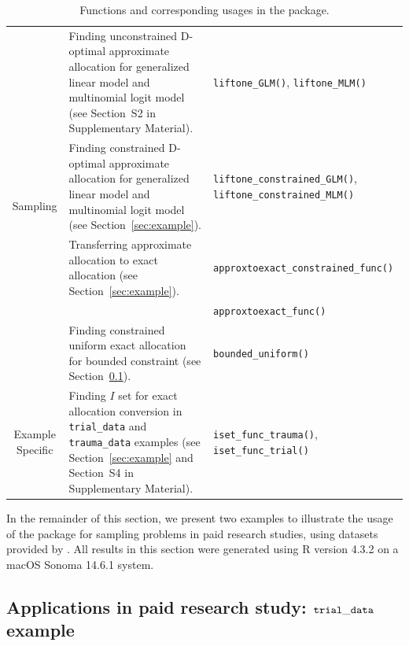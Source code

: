 \begin{table}[htb!]
\begin{tabularx}{\textwidth}{c|b|m}
    \multirow[c]{5}{*}{Sampling} & Finding unconstrained D-optimal approximate allocation for generalized linear model and multinomial logit model (see Section~S2 in Supplementary Material). & \texttt{liftone\_GLM()}, \texttt{liftone\_MLM()}\\
    & Finding constrained D-optimal approximate allocation for generalized linear model and multinomial logit model (see Section~\ref{sec:example}). & \texttt{liftone\_constrained\_GLM()}, \texttt{liftone\_constrained\_MLM()}\\
    & Transferring approximate allocation to exact allocation (see Section~\ref{sec:example}). & \texttt{approxtoexact\_constrained\_func()}\\
    &                                                   & \texttt{approxtoexact\_func()}\\
    & Finding constrained uniform exact allocation for bounded constraint (see Section~\ref{sec:example_glm}). & \texttt{bounded\_uniform()}\\\hline
    \multirow[c]{1}{*}{Example Specific} & Finding $I$ set for exact allocation conversion in \texttt{trial\_data} and \texttt{trauma\_data} examples (see Section~\ref{sec:example} and Section~S4 in Supplementary Material). & \texttt{iset\_func\_trauma()}, \texttt{iset\_func\_trial()}\\\bottomrule
  \end{tabularx}
  \caption{Functions and corresponding usages in the  package.}\label{Tab:summary_functions}
\end{table}

In the remainder of this section, we present two examples to illustrate the usage of the  package for sampling problems in paid research studies, using datasets provided by . All results in this section were generated using R version 4.3.2 on a macOS Sonoma 14.6.1 system.

\subsection{Applications in paid research study: $\tt trial\_data$ example}\label{sec:example_glm}

